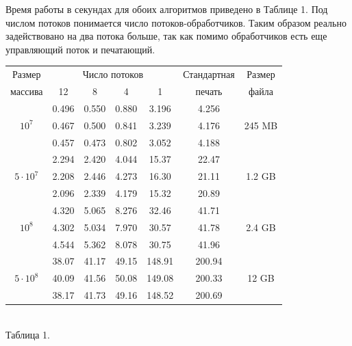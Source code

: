 Время работы в секундах для обоих алгоритмов приведено в Таблице 1.
Под числом потоков понимается число потоков-обработчиков. 
Таким образом реально задействовано на два потока больше, так как помимо обработчиков есть еще управляющий поток и печатающий.
\begin{center}
\begin{tabular}{||c|c|c|c|c|c|c||}
\hline
\hline
Размер & \multicolumn{4}{c|}{Число потоков} & Стандартная & Размер\\
\hhline{~|-|-|-|-|~|~|}
массива & 12 & 8 & 4 & 1 & печать &файла\\
\hline
\hline
 & 0.496 & 0.550 & 0.880 & 3.196 & 4.256 & \\
\hhline{~|-|-|-|-|-|~|}
$10^7$   & 0.467 & 0.500 & 0.841 & 3.239 & 4.176 & 245 MB \\
\hhline{~|-|-|-|-|-|~|}
 & 0.457 & 0.473 & 0.802 & 3.052 & 4.188 &\\
\hline
&2.294 & 2.420 & 4.044 & 15.37 & 22.47 & \\
\hhline{~|-|-|-|-|-|~|}
$5 \cdot 10^7$  & 2.208 & 2.446 & 4.273 & 16.30 & 21.11 &  1.2 GB\\
\hhline{~|-|-|-|-|-|~|}
 & 2.096 & 2.339 & 4.179 & 15.32 & 20.89 & \\
\hline
 & 4.320 & 5.065 & 8.276 & 32.46 & 41.71 & \\
\hhline{~|-|-|-|-|-|~|}
$10^8$  & 4.302 & 5.034 & 7.970 & 30.57 & 41.78 & 2.4 GB\\
\hhline{~|-|-|-|-|-|~|}
& 4.544 & 5.362& 8.078 & 30.75 & 41.96 & \\
\hline
 & 38.07 & 41.17 & 49.15 & 148.91 & 200.94 & \\
\hhline{~|-|-|-|-|-|~|}
$5 \cdot 10^8$ & 40.09 & 41.56 & 50.08 & 149.08 & 200.33 & 12 GB\\
\hhline{~|-|-|-|-|-|~|}
 & 38.17& 41.73& 49.16 & 148.52 & 200.69 & \\
\hline
\hline
\end{tabular}\\ \vspace{10pt}
\small{Таблица 1.}
\end{center}

